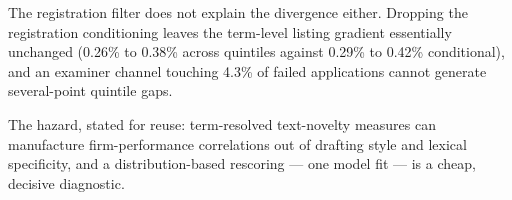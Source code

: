 The registration filter does not explain the divergence either. Dropping
the registration conditioning leaves the term-level listing gradient
essentially unchanged (0.26\% to 0.38\% across quintiles against 0.29\%
to 0.42\% conditional), and an examiner channel touching 4.3\% of failed
applications cannot generate several-point quintile gaps.

The hazard, stated for reuse: term-resolved text-novelty measures can
manufacture firm-performance correlations out of drafting style and
lexical specificity, and a distribution-based rescoring --- one model
fit --- is a cheap, decisive diagnostic.
